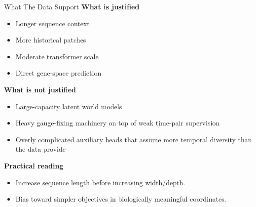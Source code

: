 \documentclass[aspectratio=169,11pt]{beamer}
\begin{document}
\begin{frame}{What The Data Support}
\textbf{What is justified}
\begin{itemize}
    \item Longer sequence context
    \item More historical patches
    \item Moderate transformer scale
    \item Direct gene-space prediction
\end{itemize}

\vspace{0.5em}
\textbf{What is not justified}
\begin{itemize}
    \item Large-capacity latent world models
    \item Heavy gauge-fixing machinery on top of weak time-pair supervision
    \item Overly complicated auxiliary heads that assume more temporal diversity than the data provide
\end{itemize}

\vspace{0.5em}
\textbf{Practical reading}
\begin{itemize}
    \item Increase sequence length before increasing width/depth.
    \item Bias toward simpler objectives in biologically meaningful coordinates.
\end{itemize}
\end{frame}
\end{document}
